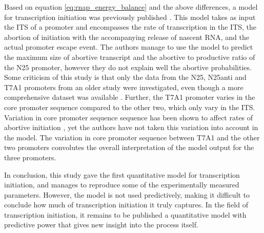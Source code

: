 Based on equation \eqref{eq:rnap_energy_balance} and the above differences, a
model for transcription initiation was previously published
\cite{xue_kinetic_2008}. This model takes as input the ITS of a promoter and
encompasses the rate of transcription in the ITS, the abortion of initiation
with the accompanying release of nascent RNA, and the actual promoter escape
event. The authors manage to use the model to predict the maximum size of
abortive transcript and the abortive to productive ratio of the N25 promoter,
however they do not explain well the abortive probabilities. Some criticism of
this study is that only the data from the N25, N25anti and T7A1 promoters from
an older study were investigated, even though a more comprehensive dataset was
available \cite{hsu_initial_2006}. Further, the T7A1 promoter varies in the
core promoter sequence compared to the other two, which only vary in the ITS.
Variation in core promoter sequence sequence has been shown to affect rates of
abortive initiation \cite{vo_vitro_2003-1}, yet the authors have not taken this
variation into account in the model. The variation in core promoter sequence
between T7A1 and the other two promoters convolutes the overall interpretation
of the model output for the three promoters.

In conclusion, this study gave the first quantitative model for transcription
initiation, and manages to reproduce some of the experimentally measured
parameters. However, the model is not used predictively, making it difficult to
conclude how much of transcription initiation it truly captures. In the field
of transcription initiation, it remains to be published a quantitative model
with predictive power that gives new insight into the process itself.
